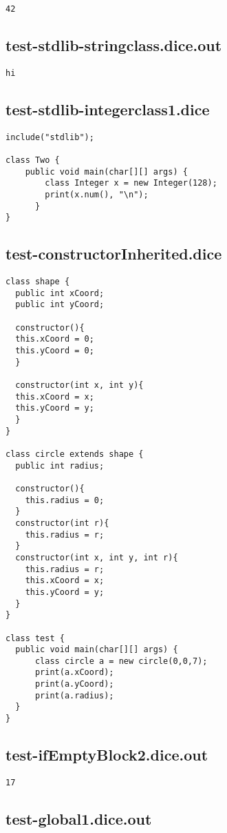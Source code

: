 \begin{verbatim}
42
\end{verbatim}\pagebreak\subsection{test-stdlib-stringclass.dice.out}
\begin{verbatim}
hi
\end{verbatim}\pagebreak\subsection{test-stdlib-integerclass1.dice}
\begin{verbatim}
include("stdlib");

class Two {
	public void main(char[][] args) {
        class Integer x = new Integer(128);
        print(x.num(), "\n");
      }
}

\end{verbatim}\pagebreak\subsection{test-constructorInherited.dice}
\begin{verbatim}
class shape {
  public int xCoord;
  public int yCoord;

  constructor(){
  this.xCoord = 0;
  this.yCoord = 0;
  }

  constructor(int x, int y){
  this.xCoord = x;
  this.yCoord = y;
  }
}

class circle extends shape {
  public int radius;

  constructor(){
  	this.radius = 0;
  }
  constructor(int r){
  	this.radius = r;
  }
  constructor(int x, int y, int r){
  	this.radius = r;
  	this.xCoord = x;
  	this.yCoord = y;
  }
}

class test {
  public void main(char[][] args) {
      class circle a = new circle(0,0,7); 
      print(a.xCoord);
      print(a.yCoord);
      print(a.radius);
  }
}
\end{verbatim}\pagebreak\subsection{test-ifEmptyBlock2.dice.out}
\begin{verbatim}
17
\end{verbatim}\pagebreak\subsection{test-global1.dice.out}
